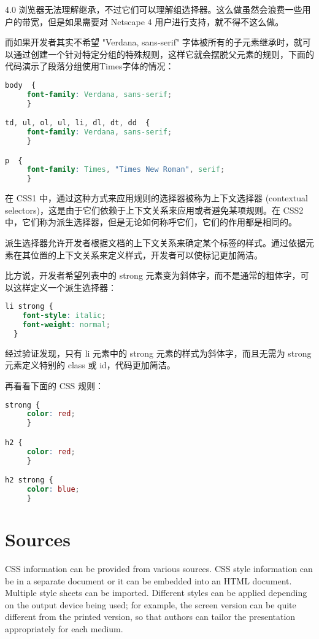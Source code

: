 4.0 浏览器无法理解继承，不过它们可以理解组选择器。这么做虽然会浪费一些用户的带宽，但是如果需要对 Netscape 4 用户进行支持，就不得不这么做。

而如果开发者其实不希望 "Verdana, sans-serif" 字体被所有的子元素继承时，就可以通过创建一个针对特定分组的特殊规则，这样它就会摆脱父元素的规则，下面的代码演示了段落分组使用Times字体的情况：

\begin{lstlisting}[language=CSS]
body  {
     font-family: Verdana, sans-serif;
     }

td, ul, ol, ul, li, dl, dt, dd  {
     font-family: Verdana, sans-serif;
     }

p  {
     font-family: Times, "Times New Roman", serif;
     }
\end{lstlisting}

在 CSS1 中，通过这种方式来应用规则的选择器被称为上下文选择器 (contextual selectors)，这是由于它们依赖于上下文关系来应用或者避免某项规则。在 CSS2 中，它们称为派生选择器，但是无论如何称呼它们，它们的作用都是相同的。

派生选择器允许开发者根据文档的上下文关系来确定某个标签的样式。通过依据元素在其位置的上下文关系来定义样式，开发者可以使标记更加简洁。

比方说，开发者希望列表中的 strong 元素变为斜体字，而不是通常的粗体字，可以这样定义一个派生选择器：

\begin{lstlisting}[language=CSS]
li strong {
    font-style: italic;
    font-weight: normal;
  }
\end{lstlisting}

经过验证发现，只有 li 元素中的 strong 元素的样式为斜体字，而且无需为 strong 元素定义特别的 class 或 id，代码更加简洁。

再看看下面的 CSS 规则：

\begin{lstlisting}[language=CSS]
strong {
     color: red;
     }

h2 {
     color: red;
     }

h2 strong {
     color: blue;
     }
\end{lstlisting}


\section{Sources}


CSS information can be provided from various sources. CSS style information can be in a separate document or it can be embedded into an HTML document. Multiple style sheets can be imported. Different styles can be applied depending on the output device being used; for example, the screen version can be quite different from the printed version, so that authors can tailor the presentation appropriately for each medium.


